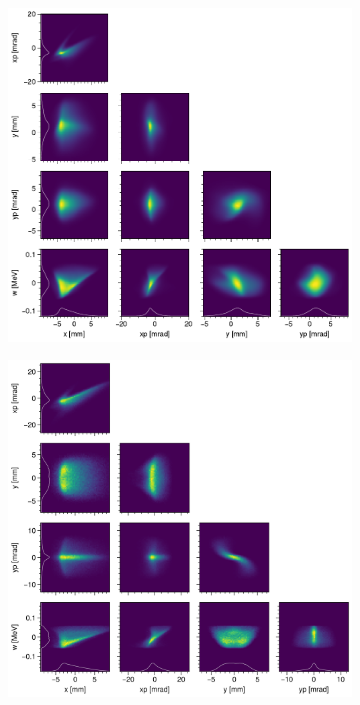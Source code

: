 \documentclass[letterpaper,
               keeplastbox,
               nospread,
               biblatex,
              ]{jacow}
\begin{document}
%
\begin{figure}[!t]
    \centering
    \begin{subfigure}{0.48\textwidth}
        \includegraphics[width=\textwidth]{VS34_corner.pdf}
        \caption{}
        \label{fig:VS34_a}
    \end{subfigure}
    \hfill
    \hspace{0.1cm}
    \hfill
    \begin{subfigure}{0.48\textwidth}
        \includegraphics[width=\textwidth]{VS34_corner_sim.png}

\end{subfigure}
\end{figure}
\end{document}
